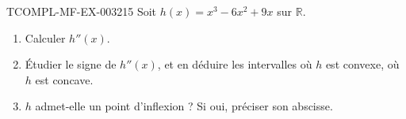 \begin{exercice}{TCOMPL-MF-EX-003}{2}{15}
Soit $h(x) = x^3 - 6x^2 + 9x$ sur $\mathbb{R}$.
\begin{enumerate}
  \item Calculer $h''(x)$.
  \item Étudier le signe de $h''(x)$, et en déduire les intervalles où $h$ est convexe, où $h$ est concave.
  \item $h$ admet-elle un point d'inflexion ? Si oui, préciser son abscisse.
\end{enumerate}
\end{exercice}
